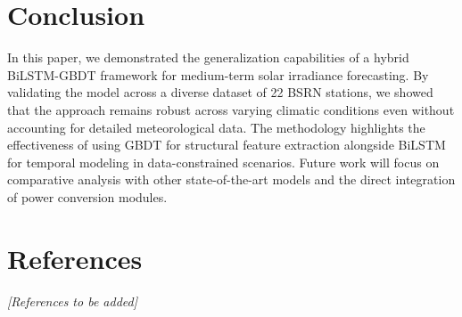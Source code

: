 \documentclass{article}
\begin{document}
\section{Conclusion}
In this paper, we demonstrated the generalization capabilities of a hybrid BiLSTM-GBDT framework for medium-term solar irradiance forecasting. By validating the model across a diverse dataset of 22 BSRN stations, we showed that the approach remains robust across varying climatic conditions even without accounting for detailed meteorological data. The methodology highlights the effectiveness of using GBDT for structural feature extraction alongside BiLSTM for temporal modeling in data-constrained scenarios. Future work will focus on comparative analysis with other state-of-the-art models and the direct integration of power conversion modules.

\section{References}
\textit{[References to be added]}
\end{document}
